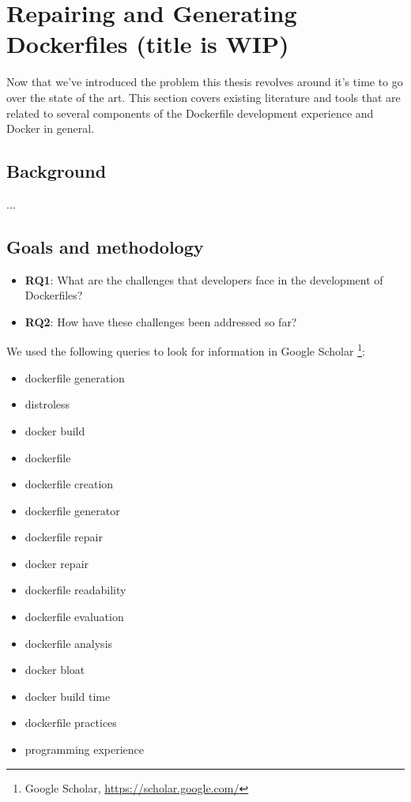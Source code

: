 \chapter{Repairing and Generating Dockerfiles (title is WIP)} \label{chap:sota}

Now that we've introduced the problem this thesis revolves around it's time to go over the state of the art.
This section covers existing literature and tools that are related to several components of the Dockerfile development experience and Docker in general.


\section{Background} \label{sec:background}
...

\section{Goals and methodology}



\begin{itemize}
    \item \textbf{RQ1}: What are the challenges that developers face in the development of Dockerfiles?
    \item \textbf{RQ2}: How have these challenges been addressed so far?
\end{itemize}

We used the following queries to look for information in Google Scholar \footnote{Google Scholar, \url{https://scholar.google.com/}}:

\begin{itemize}
    \item dockerfile generation
    \item distroless
    \item docker build
    \item dockerfile
    \item dockerfile creation
    \item dockerfile generator
    \item dockerfile repair
    \item docker repair
    \item dockerfile readability
    \item dockerfile evaluation
    \item dockerfile analysis
    \item docker bloat
    \item docker build time
    \item dockerfile practices
    \item programming experience
\end{itemize}


